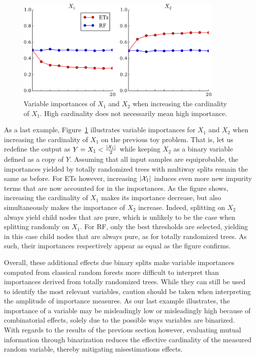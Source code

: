 \begin{figure}
\centering
\includegraphics[width=0.9\textwidth]{figures/ch7_bias_trees.pdf}
\caption{Variable importances of $X_1$ and $X_2$ when increasing the cardinality of $X_1$. High cardinality does not necessarily mean high importance. }
\label{fig:7:bias:trees}
\end{figure}

As a last example, Figure~\ref{fig:7:bias:trees} illustrates variable
importances for $X_1$ and $X_2$ when increasing the cardinality of $X_1$ on the
previous toy problem. That is, let us redefine the output as $Y = X_1 <
\tfrac{|{\cal X}_1|}{2}$ while keeping $X_2$ as a binary variable defined as a
copy of $Y$. Assuming that all input samples are equiprobable, the importances
yielded by totally randomized trees with multiway splits remain the same as
before. For ETs however, increasing $|{\cal X}_1|$ induces even more new impurity terms
that are now accounted for in the importances. As the figure shows, increasing
the cardinality of $X_1$ makes its importance decrease, but also simultaneously
makes the importance of $X_2$ increase. Indeed, splitting on $X_2$ always yield
child nodes that are pure, which is unlikely to be the case when splitting
randomly on $X_1$. For RF, only the best thresholds are selected, yielding in
this case child nodes that are always pure, as for totally randomized trees.
As such, their importances respectively appear as equal as the figure confirms.

Overall, these additional effects due binary splits make variable importances
computed from classical random forests more difficult to interpret than
importances derived from totally randomized trees. While they can still be used
to identify the most relevant variables, caution should be taken when
interpreting the amplitude of importance measures. As our last example
illustrates, the importance of a variable may be misleadingly low or
misleadingly high because of combinatorial effects, solely due to the possible
ways variables are binarized. With regards to the results of the previous
section however, evaluating mutual information through binarization reduces
the effective cardinality of the measured random variable, thereby mitigating
misestimations effects.

